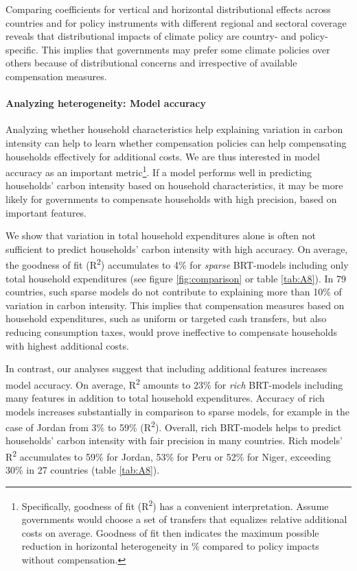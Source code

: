 \documentclass[12pt, a4paper]{article}
\begin{document}
Comparing coefficients for vertical and horizontal distributional effects across countries and for policy instruments with different regional and sectoral coverage reveals that distributional impacts of climate policy are country- and policy-specific. This implies that governments may prefer some climate policies over others because of distributional concerns and irrespective of available compensation measures.

\paragraph{Analyzing heterogeneity: Model accuracy} 
Analyzing whether household characteristics help explaining variation in carbon intensity can help to learn whether compensation policies can help compensating households effectively for additional costs. We are thus interested in model accuracy as an important metric\footnote{Specifically, goodness of fit (R\textsuperscript{2}) has a convenient interpretation. Assume governments would choose a set of transfers that equalizes relative additional costs on average. Goodness of fit then indicates the maximum possible reduction in horizontal heterogeneity in \% compared to policy impacts without compensation.}. If a model performs well in predicting households' carbon intensity based on household characteristics, it may be more likely for governments to compensate households with high precision, based on important features. 

We show that variation in total household expenditures alone is often not sufficient to predict households' carbon intensity with high accuracy. On average, the goodness of fit (R\textsuperscript{2}) accumulates to 4\% for \textit{sparse} BRT-models including only total household expenditures (see figure \ref{fig:comparison} or table \ref{tab:A8}). In 79 countries, such sparse models do not contribute to explaining more than 10\% of variation in carbon intensity. This implies that compensation measures based on household expenditures, such as uniform or targeted cash transfers, but also reducing consumption taxes, would prove ineffective to compensate households with highest additional costs.

In contrast, our analyses suggest that including additional features increases model accuracy. On average, R\textsuperscript{2} amounts to 23\% for \textit{rich} BRT-models including many features in addition to total household expenditures. Accuracy of rich models increases substantially in comparison to sparse models, for example in the case of Jordan from 3\% to 59\% (R\textsuperscript{2}). Overall, rich BRT-models helps to predict households' carbon intensity with fair precision in many countries. Rich models' R\textsuperscript{2} accumulates to 59\% for Jordan, 53\% for Peru or 52\% for Niger, exceeding 30\% in 27 countries (table \ref{tab:A8}).
\end{document}
